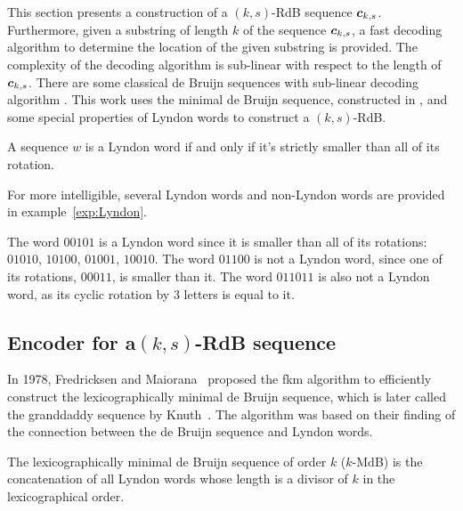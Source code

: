 
This section presents a construction of a $(k,s)$-RdB sequence ${\boldsymbol c}_{k,s}$. Furthermore, given a substring of length $k$ of the sequence ${\boldsymbol c}_{k,s}$, a fast decoding algorithm to determine the location of the given substring is provided. The complexity of the decoding algorithm is sub-linear with respect to the length of ${\boldsymbol c}_{k,s}$. There are some classical de Bruijn sequences with sub-linear decoding algorithm \cite{mitchell1996method,tuliani2001bruijn,kociumaka2016efficient}. This work uses the minimal de Bruijn sequence, constructed in \cite{kociumaka2016efficient,fredricksen1978necklaces}, and some special properties of Lyndon words to construct a $(k,s)$-RdB.

\begin{definition}
    A sequence $w$ is a Lyndon word if and only if it's strictly smaller than all of its rotation.
\end{definition}
For more intelligible, several Lyndon words and non-Lyndon words are provided in example~\ref{exp:Lyndon}.
\begin{example}\label{exp:Lyndon}
    The word $00101$ is a Lyndon word since it is smaller than all of its rotations: $01010$, $10100$, $01001$, $10010$. The word $01100$ is not a Lyndon word, since one of its rotations, $00011$, is smaller than it. The word $011011$ is also not a Lyndon word, as its cyclic rotation by $3$ letters is equal to it. 
\end{example}

\subsection{Encoder for a\texorpdfstring{$(k,s)$}{(k,s)}-RdB sequence} \label{subsect:encoder}
In 1978, Fredricksen and Maiorana~\cite{fredricksen1978necklaces} proposed the \gls{fkm} algorithm to efficiently construct the lexicographically minimal de Bruijn sequence, which is later called the granddaddy sequence by Knuth~\cite{knuth2013art}. The algorithm was based on their finding of the connection between the de Bruijn sequence and Lyndon words.

\begin{lemma}\label{lem:FKM}
    The lexicographically minimal de Bruijn sequence of order $k$ ($k$-MdB) is the concatenation of all Lyndon words whose length is a divisor of $k$ in the lexicographical order.
\end{lemma}

